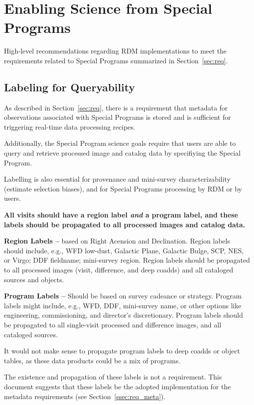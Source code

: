 \section{Enabling Science from Special Programs}\label{sec:sci}

High-level recommendations regarding RDM implementations to meet the 
requirements related to Special Programs summarized in Section~\ref{sec:req}.


\subsection{Labeling for Queryability}\label{ssec:sci_labels}

As described in Section~\ref{sec:req}, there is a requirement that metadata for 
observations associated with Special Programs is stored and is sufficient for 
triggering real-time data processing recipes.

Additionally, the Special Program science goals require that users are able to 
query and retrieve processed image and catalog data by specifiying the Special Program. 

Labelling is also essential for provenance and mini-survey 
characterizability (estimate selection biases), and for Special Programs 
processing by RDM or by users.

\textbf{All visits should have a region label \textit{and} a program 
label, and these labels should be propagated to all processed images and catalog data.}

\textbf{Region Labels -- } based on Right Acension and Declination.
Region labels should include, e.g., WFD low-dust, Galactic Plane, Galactic 
Bulge, SCP, NES, or Virgo; DDF fieldname; mini-survey region.
Region labels should be propagated to all processed images (visit, 
difference, and deep coadds) and all cataloged sources and objects. 

\textbf{Program Labels -- } 
Should be based on survey cadeance or strategy.
Program labels might include, e.g., WFD, DDF, mini-survey name, or other 
options like engineering, commissioning, and director's discretionary.
Program labels should be propagated to all single-visit processed and 
difference images, and all cataloged sources.

It would not make sense to propagate program labels to deep coadds or 
object tables, as these data products could be a mix of programs.

The existence and propagation of these labels is not a requirement.
This document suggests that these labels be the adopted implementation for 
the metadata requirements (see Section~\ref{ssec:req_meta}).


